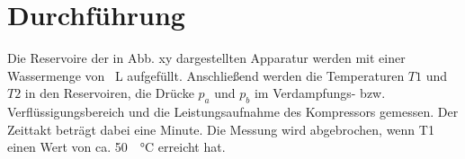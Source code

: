 \section{Durchführung}
\label{sec:Durchführung}

Die Reservoire der in Abb. xy dargestellten Apparatur werden mit einer Wassermenge von \SI{}{\liter} aufgefüllt. Anschließend werden die Temperaturen $T1$ und $T2$ in den Reservoiren, die Drücke $p_a$ und $p_b$ im Verdampfungs- bzw. Verflüssigungsbereich und die Leistungsaufnahme des Kompressors gemessen. Der Zeittakt beträgt dabei eine Minute. 
Die Messung wird abgebrochen, wenn T1 einen Wert von ca. \SI{50}{\degrees\celsius} erreicht hat. 

